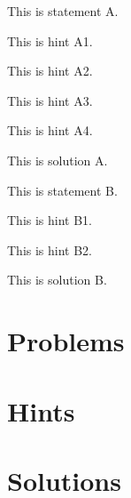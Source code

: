 \documentclass{article}
\begin{document}
\begin{problem}
	\begin{statement}
	        This is statement A.
	\end{statement}
	\begin{hint}
	        This is hint A1.
	\end{hint}
	\begin{hint}
		This is hint A2.
	\end{hint}
	\begin{hint}
	        This is hint A3.
	\end{hint}
	\begin{hint}
	        This is hint A4.
	\end{hint}
	\begin{solution}
	        This is solution A.
	\end{solution}
\end{problem}

\begin{problem}
	\begin{statement}
	        This is statement B.
	\end{statement}
	\begin{hint}
	        This is hint B1.
	\end{hint}
	\begin{hint}
		This is hint B2.
	\end{hint}
	\begin{solution}
	        This is solution B.
	\end{solution}
\end{problem}



\section{Problems}
\placestatements

\section{Hints}
\randomplacehints

\section{Solutions}
\placesolutions
\end{document}
